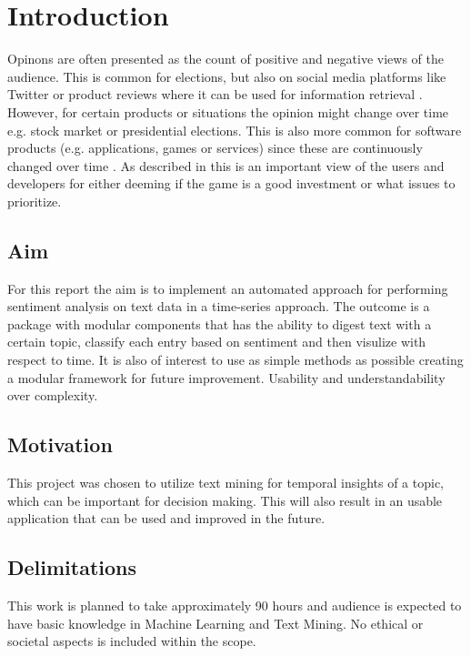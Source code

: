 \chapter{Introduction}
\label{cha:introduction}


Opinons are often presented as the count of positive and negative views of the audience. This is common for elections, 
but also on social media platforms like Twitter or product reviews where it can be used for information retrieval \cite{twitter_mining}. 
However, for certain products or situations the opinion might change over time e.g. stock market or presidential elections. 
This is also more common for software products (e.g. applications, games or services) since these are continuously changed over time \cite{steam_reviews}.
As described in \cite{steam_reviews} this is an important view of the users and developers for either deeming if the game is a good investment or what 
issues to prioritize.




\section{Aim}
\label{sec:aim}

For this report the aim is to implement an automated approach for performing sentiment analysis on text data in a time-series approach. 
The outcome is a package with modular components that has the ability to digest text with a certain topic, classify each entry based on sentiment and then visulize with respect to time.
It is also of interest to use as simple methods as possible creating a modular framework for future improvement. 
Usability and understandability over complexity.


\section{Motivation}
\label{sec:motivation}

This project was chosen to utilize text mining for temporal insights of a topic, which can be important for decision making. This will also result in an usable application 
that can be used and improved in the future. 


\section{Delimitations}
\label{sec:delimitations}


This work is planned to take approximately 90 hours and audience is expected to have basic knowledge in Machine Learning and Text Mining. 
No ethical or societal aspects is included within the scope.
